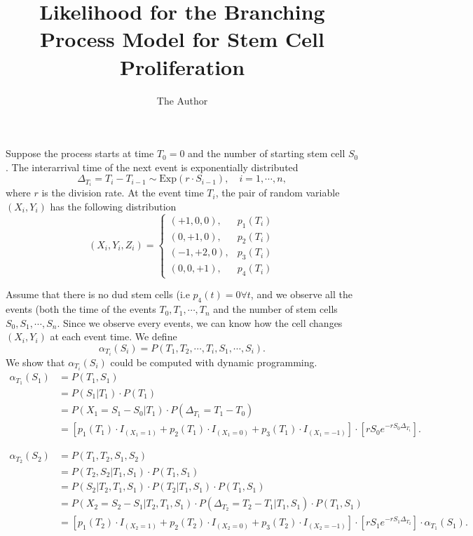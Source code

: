 \documentclass[10pt]{article}
\title{Likelihood for the Branching Process Model for Stem Cell Proliferation}
\author{The Author}
\date{} %
\begin{document}
\maketitle
Suppose the process starts at time $T_0 = 0$ and the number of starting stem cell $S_0$. The interarrival time of the next event is exponentially distributed
$$\Delta_{T_i} = T_i - T_{i-1} \sim \text{Exp}(r\cdot S_{i-1}), \quad i = 1, \cdots, n,$$
where $r$ is the division rate. At the event time $T_i$, the pair of random variable $(X_i, Y_i)$ has the following distribution 
\begin{equation}
(X_i, Y_i, Z_i) = \begin{cases}
(+1, 0, 0), & p_1(T_i) \\
(0, +1, 0), & p_2(T_i) \\
(-1,+2, 0), & p_3(T_i) \\
(0, 0, +1), & p_4(T_i)
\end{cases} 
\end{equation}

Assume that there is no dud stem cells (i.e $p_4(t) = 0 \forall t$, and we observe all the events (both the time of the events $T_0, T_1, \cdots, T_n$ and the number of stem cells $S_0, S_1, \cdots, S_n$. Since we observe every events, we can know how the cell changes $(X_i,Y_i)$ at each event time.  We define
$$\alpha_{T_i}(S_i) = P(T_1, T_2, \cdots, T_i, S_1, \cdots, S_i).$$
We show that $\alpha_{T_i} (S_i)$ could be computed with dynamic programming. 
\begin{equation}
\begin{split}
\alpha_{T_1}(S_1) & = P(T_1, S_1) \\
& = P(S_1 \vert T_1) \cdot P(T_1) \\
& = P(X_1 = S_1 -S_0 \vert T_1) \cdot P(\Delta_{T_1} = T_1 - T_0) \\
& = [p_1(T_1)\cdot I_{(X_1 = 1)} + p_2(T_1)\cdot I_{(X_1 = 0)} + p_3(T_1) \cdot I_{(X_1=-1)}] \cdot [rS_0 e^{-rS_0 \Delta_{T_1}}].
\end{split} 
\end{equation}

\begin{equation}
\begin{split}
\alpha_{T_2} (S_2) & = P(T_1, T_2, S_1, S_2) \\
& = P(T_2, S_2 \vert T_1, S_1) \cdot P(T_1, S_1) \\
& = P(S_2 \vert T_2, T_1, S_1) \cdot P(T_2 \vert T_1, S_1) \cdot P(T_1, S_1) \\
& = P(X_2 = S_2 -S_1 \vert T_2, T_1, S_1) \cdot P(\Delta_{T_2} = T_2 - T_1 \vert T_1, S_1) \cdot P(T_1, S_1) \\
& =  [p_1(T_2)\cdot I_{(X_2 = 1)} + p_2(T_2)\cdot I_{(X_2 = 0)} + p_3(T_2) \cdot I_{(X_2=-1)}] \cdot  [rS_1 e^{-rS_1 \Delta_{T_2}}] \cdot \alpha_{T_1}(S_1).
\end{split}
\end{equation}
\end{document}

